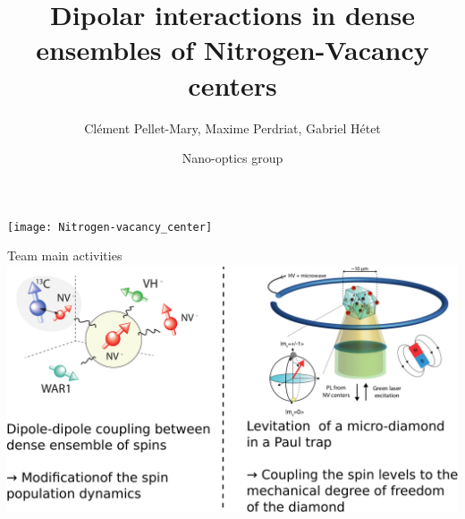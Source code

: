 \documentclass{beamer}
\title{Dipolar interactions in dense ensembles of Nitrogen-Vacancy centers}
\author{Clément Pellet-Mary, Maxime Perdriat, Gabriel Hétet}
\date{Nano-optics group}
\begin{document}
\begin{frame}
\maketitle
\centering
\texttt{[image: Nitrogen-vacancy\_center]}
\end{frame}
\begin{frame}{Team main activities}
\centering
\includegraphics[width=\textwidth,height=0.9\textheight,keepaspectratio]{Slide activités}
\end{frame}
\end{document}
